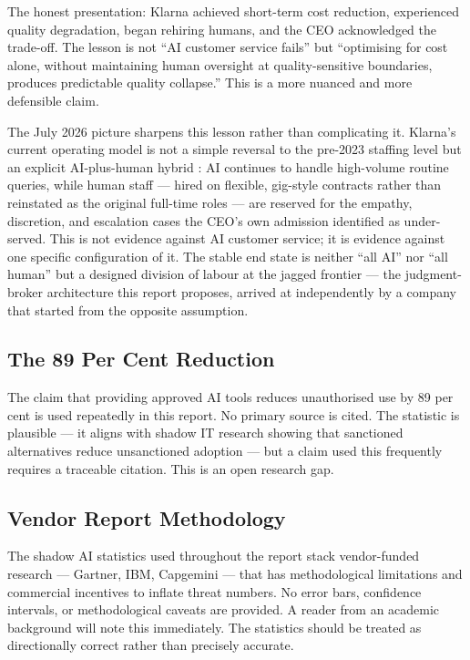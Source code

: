 The honest presentation: Klarna achieved short-term cost reduction, experienced quality degradation, began rehiring humans, and the CEO acknowledged the trade-off. The lesson is not ``AI customer service fails'' but ``optimising for cost alone, without maintaining human oversight at quality-sensitive boundaries, produces predictable quality collapse.'' This is a more nuanced and more defensible claim.

The July 2026 picture sharpens this lesson rather than complicating it. Klarna's current operating model is not a simple reversal to the pre-2023 staffing level but an explicit AI-plus-human hybrid \parencite{KlarnaHybrid2026}: AI continues to handle high-volume routine queries, while human staff --- hired on flexible, gig-style contracts rather than reinstated as the original full-time roles --- are reserved for the empathy, discretion, and escalation cases the CEO's own admission identified as under-served. This is not evidence against AI customer service; it is evidence against one specific configuration of it. The stable end state is neither ``all AI'' nor ``all human'' but a designed division of labour at the jagged frontier --- the judgment-broker architecture this report proposes, arrived at independently by a company that started from the opposite assumption.

\subsection{The 89 Per Cent Reduction}

The claim that providing approved AI tools reduces unauthorised use by 89 per cent is used repeatedly in this report. No primary source is cited. The statistic is plausible --- it aligns with shadow IT research showing that sanctioned alternatives reduce unsanctioned adoption --- but a claim used this frequently requires a traceable citation. This is an open research gap.

\subsection{Vendor Report Methodology}

The shadow AI statistics used throughout the report stack vendor-funded research --- Gartner, IBM, Capgemini --- that has methodological limitations and commercial incentives to inflate threat numbers. No error bars, confidence intervals, or methodological caveats are provided. A reader from an academic background will note this immediately. The statistics should be treated as directionally correct rather than precisely accurate.

